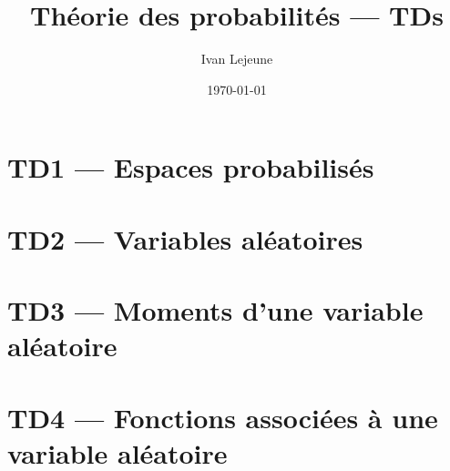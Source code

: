 \documentclass[french,a4paper,10pt]{article}
\title{\color{astral} \sffamily \bfseries Théorie des probabilités --- TDs}
\author{Ivan Lejeune}
\date{\today}
\begin{document}
    \maketitle
    \tableofcontents
    \newpage

    \section*{TD1 --- Espaces probabilisés}\label{sec:TD1}
    \setcounter{section}{1}
    \setcounter{tdcounter}{0}
    
    \newpage

    \section*{TD2 --- Variables aléatoires}\label{sec:TD2}
    \setcounter{section}{2}
    \setcounter{tdcounter}{0}
    
    \newpage
    
    \section*{TD3 --- Moments d'une variable aléatoire}\label{sec:TD3}
    \setcounter{section}{3}
    \setcounter{tdcounter}{0}
    

    \section*{TD4 --- Fonctions associées à une variable aléatoire}\label{sec:TD4}
    \setcounter{section}{4}
    \setcounter{tdcounter}{0}
    
\end{document}
